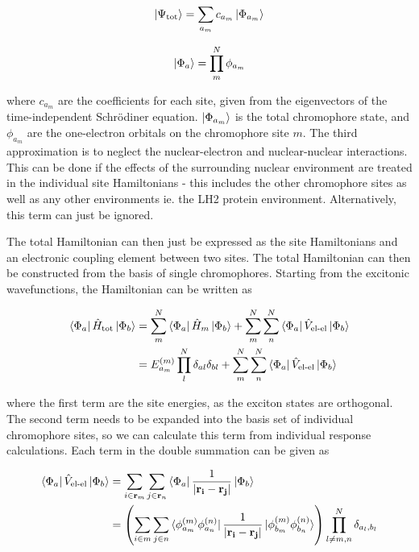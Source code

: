 \begin{equation}
\ket{\Psi_\text{tot}} = \sum_{a_m} c_{a_m} \ket{\Phi_{a_m}}
\end{equation}

\begin{equation}
\ket{\Phi_a} = \prod^N_m \phi_{a_m}
\end{equation}

where $c_{a_m}$ are the coefficients for each site, given from the eigenvectors 
of the time-independent Schrödiner equation. $\ket{\Phi_{a_m}}$ is the total chromophore
state, and $\phi_{a_m}$ are the one-electron orbitals on the chromophore site $m$.
The third approximation is to neglect the nuclear-electron and nuclear-nuclear interactions.
This can be done if the effects of the surrounding nuclear environment are treated
in the individual site Hamiltonians\cite{Scholes2003} - this includes the other 
chromophore sites as well as any other environments ie. the LH2 protein environment.
Alternatively, this term can just be ignored.

The total Hamiltonian can then just be expressed as the site Hamiltonians and an 
electronic coupling element between two sites. The total Hamiltonian can then be
constructed from the basis of single chromophores. Starting from the excitonic wavefunctions,
the Hamiltonian can be written as

\begin{equation}
\begin{aligned}
\bra{\Phi_a} \hat{H}_{\text{tot}}\ket{\Phi_b} &= \sum^N_m \bra{\Phi_a} \hat{H}_{m}\ket{\Phi_b} + \sum^N_m \sum^N_n \bra{\Phi_a} \hat{V}_{\text{el-el}}\ket{\Phi_b} \\
&= E^{\left(m\right)}_{a_m} \prod^N_l \delta_{al} \delta_{bl} + \sum^N_m \sum^N_n \bra{\Phi_a} \hat{V}_{\text{el-el}}\ket{\Phi_b}
\end{aligned}
\end{equation}

where the first term are the site energies, as the exciton states are orthogonal. 
The second term needs to be expanded into the basis set of individual chromophore 
sites, so we can calculate this term from individual response calculations. Each 
term in the double summation can be given as

\begin{equation}
\begin{aligned}
\bra{\Phi_a} \hat{V}_{\text{el-el}}\ket{\Phi_b} &= \sum_{i \in \mathbf{r}_m} \sum_{j \in \mathbf{r}_n} \bra{\Phi_a} \frac{1}{\left|\mathbf{r_i} - \mathbf{r_j}\right|} \ket{\Phi_b} \\
&= \left(\sum_{i \in m} \sum_{j \in n} \bra{\phi^{\left(m\right)}_{a_m} \phi^{\left(n\right)}_{a_n}} \frac{1}{\left|\mathbf{r_i} - \mathbf{r_j}\right|} \ket{\phi^{\left(m\right)}_{b_m}\phi^{\left(n\right)}_{b_n}}\right)\prod^N_{l\neq m,n}\delta_{a_l, b_l}
\end{aligned}
\end{equation}

